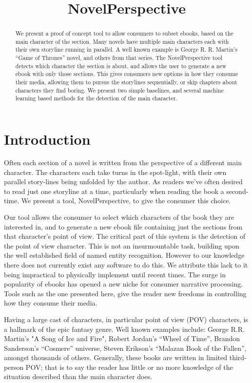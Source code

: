 \documentclass[11pt,a4paper]{article}
\title{NovelPerspective}
\begin{document}
\maketitle

\begin{abstract}
We present a proof of concept tool to allow consumers to subset ebooks, based on the main character of the section.
Many novels have multiple main characters each with their own storyline running in parallel.
A well known example is George R. R. Martin's ``Game of Thrones'' novel, and others from that series.
The NovelPerspective tool detects which character the section is about,
and allows the user to generate a new ebook with only those sections.
This gives consumers new options in how they consume their media, allowing them to  pursue the storylines sequentially, or skip chapters about characters they find boring.
We present two simple baselines, and several machine learning based methods for the detection of the main character.
\end{abstract}

\section{Introduction}
Often each section of a novel is written  from the perspective of a different main character.
The characters each take turns in the spot-light,
with their own parallel story-lines being unfolded by the author.
As readers we've often desired to read just one storyline at a time, particularly when reading the book a second-time.
We present a tool, NovelPerspective, to give the consumer this choice.

Our tool allows the consumer to select which characters of the book they are interested in,
and to generate a new ebook file containing just the sections from that character's point of view.
The critical part of this system is the detection of the point of view character.
This is not an insurmountable task, building upon the well established field of named entity recognition.
However to our knowledge there does not currently exist any  software to do this.
We attribute this lack to it being impractical to physically implement until recent times.
The surge in popularity of ebooks has opened a new niche for consumer narrative processing.
Tools such as the one presented here, give the reader new freedoms in controlling how they consume their media.

Having a large cast of characters, in particular point of view (POV) characters, is a hallmark of the epic fantasy genre.
Well known examples include: George R.R. Martin's "A Song of Ice and Fire", 
Robert Jordan's ``Wheel of Time'', Brandon Sanderson's ``Cosmere'' universe, 
Steven Erikson's ``Malazan Book of the Fallen'', amongst thousands of others.
Generally, these books are written in limited third-person POV;
that is to say the reader has little or no more knowledge of the situation described than the main character does.
\end{document}
